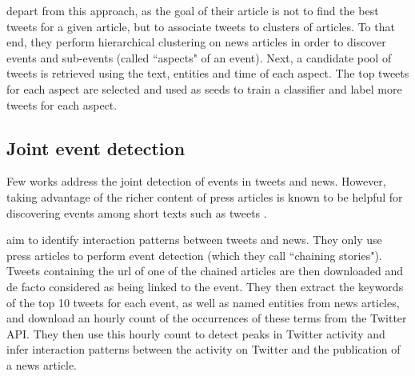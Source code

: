 \cite{wang_mining_2015} depart from this approach, as the goal of their article is not to find the best tweets for a given article, but to associate tweets to clusters of articles. To that end, they perform hierarchical clustering on news articles in order to discover events and sub-events (called ``aspects" of an event). Next, a candidate pool of tweets is retrieved using the text, entities and time of each aspect. The top tweets for each aspect are selected and used as seeds to train a classifier and label more tweets for each aspect.


\subsection{Joint event detection}
\label{Joint event detection}
Few works address the joint detection of events in tweets and news. However, taking advantage of the richer content of press articles is known to be helpful for discovering events among short texts such as tweets \citep{phan_2008_learning}.  

\cite{ning_uncovering_2015} aim to identify interaction patterns between tweets and news. They only use press articles to perform event detection (which they call ``chaining stories"). Tweets containing the url of one of the chained articles are then downloaded and de facto considered as being linked to the event. They then extract the keywords of the top 10 tweets for each event, as well as named entities from news articles, and download an hourly count of the occurrences of these terms from the Twitter API. They then use this hourly count to detect peaks in Twitter activity and infer interaction patterns between the activity on Twitter and the publication of a news article.

